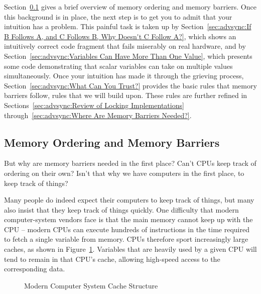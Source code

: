 Section~\ref{sec:advsync:Memory Ordering and Memory Barriers}
gives a brief overview of memory ordering and memory barriers.
Once this background is in place, the next step is to get you to admit
that your intuition has a problem.
This painful task is taken up by
Section~\ref{sec:advsync:If B Follows A, and C Follows B, Why Doesn't C Follow A?},
which shows an intuitively correct code fragment that fails miserably
on real hardware, and by
Section~\ref{sec:advsync:Variables Can Have More Than One Value},
which presents some code demonstrating that scalar variables can
take on multiple values simultaneously.
Once your intuition has made it through the grieving process,
Section~\ref{sec:advsync:What Can You Trust?}
provides the basic rules that memory barriers follow, rules that we
will build upon.
These rules are further refined in
Sections~\ref{sec:advsync:Review of Locking Implementations}
through~\ref{sec:advsync:Where Are Memory Barriers Needed?}.

\subsection{Memory Ordering and Memory Barriers}
\label{sec:advsync:Memory Ordering and Memory Barriers}

But why are memory barriers needed in the first place?
Can't CPUs keep track of ordering on their own?
Isn't that why we have computers in the first place, to keep track of things?

Many people do indeed expect their computers to keep track of things,
but many also insist that they keep track of things quickly.
One difficulty that modern computer-system vendors face is that
the main memory cannot keep up with the CPU -- modern CPUs can execute
hundreds of instructions in the time required to fetch a single variable
from memory.
CPUs therefore sport increasingly large caches, as shown in
Figure~\ref{fig:advsync:Modern Computer System Cache Structure}.
Variables that are heavily used by a given CPU will tend to remain
in that CPU's cache, allowing high-speed access to the corresponding
data.

\begin{figure}[htb]
\centering
{}
\caption{Modern Computer System Cache Structure}
\label{fig:advsync:Modern Computer System Cache Structure}
\end{figure}


